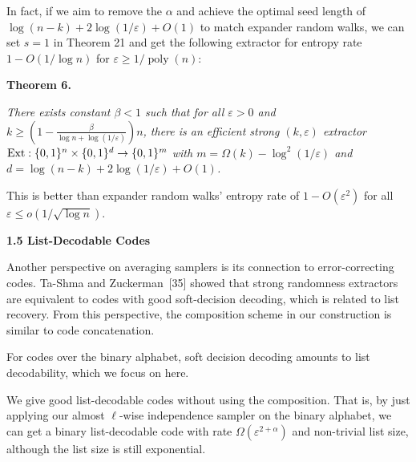 In fact, if we aim to remove the $\alpha$ and achieve the optimal seed length of $\log(n-k)+2\log(1/\varepsilon)+O(1)$ to match expander random walks, we can set $s=1$ in Theorem 21 and get the following extractor for entropy rate $1-O(1/\log n)$ for $\varepsilon\geq 1/\operatorname*{poly}(n)$:\par





\par\medskip\noindent\textbf{
\textbf{Theorem 6}\textbf{.}
}\par



\emph{There exists constant $\beta<1$ such that for all $\varepsilon>0$ and $k\geq(1-\frac{\beta}{\log n+\log(1/\varepsilon)})n$, there is an efficient strong $(k,\varepsilon)$ extractor $\textup{{Ext}}:\{0,1\}^{n}\times\{0,1\}^{d}\to\{0,1\}^{m}$ with $m=\Omega(k)-\log^{2}(1/\varepsilon)$ and $d=\log(n-k)+2\log(1/\varepsilon)+O(1)$.}\par






This is better than expander random walks’ entropy rate of $1-O(\varepsilon^{2})$ for all $\varepsilon\leq o(1/\sqrt{\log n})$.\par





\par\medskip\noindent\textbf{
1.5 List-Decodable Codes}\par




Another perspective on averaging samplers is its connection to error-correcting codes.
Ta-Shma and Zuckerman [35] showed that strong randomness extractors are equivalent to codes with good soft-decision decoding, which is related to list recovery.
From this perspective, the composition scheme in our construction is similar to code concatenation.\par




For codes over the binary alphabet, soft decision decoding amounts to list decodability, which we focus on here.\par




We give good list-decodable codes without using the composition. That is, by just applying our almost $\ell$-wise independence sampler on the binary alphabet, we can get a binary list-decodable code with rate $\Omega(\varepsilon^{2+\alpha})$ and non-trivial list size, although the list size is still exponential.\par




